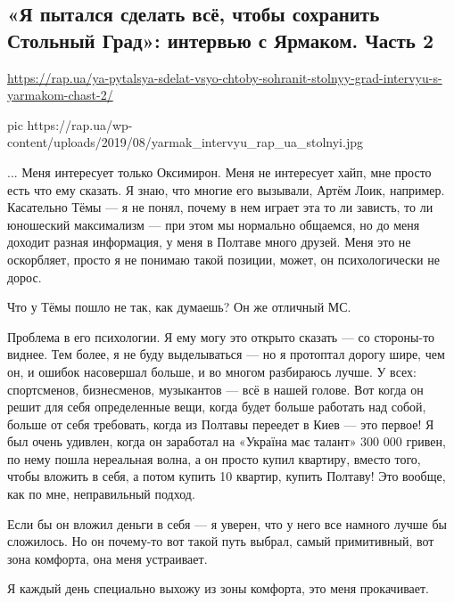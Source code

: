  
 

\subsection{«Я пытался сделать всё, чтобы сохранить Стольный Град»: интервью с Ярмаком. Часть 2}
\label{sec:02_02_2017.news.ua.rap_ua.2.yarmak}
\url{https://rap.ua/ya-pytalsya-sdelat-vsyo-chtoby-sohranit-stolnyy-grad-intervyu-s-yarmakom-chast-2/}

\ifcmt
pic https://rap.ua/wp-content/uploads/2019/08/yarmak_intervyu_rap_ua_stolnyi.jpg
\fi

... Меня интересует только Оксимирон. Меня не интересует хайп, мне просто есть
что ему сказать. Я знаю, что многие его вызывали, Артём Лоик, например.
Касательно Тёмы --- я не понял, почему в нем играет эта то ли зависть, то ли
юношеский максимализм --- при этом мы нормально общаемся, но до меня доходит
разная информация, у меня в Полтаве много друзей. Меня это не оскорбляет,
просто я не понимаю такой позиции, может, он психологически не дорос.

Что у Тёмы пошло не так, как думаешь? Он же отличный МС.

Проблема в его психологии. Я ему могу это открыто сказать --- со стороны-то
виднее. Тем более, я не буду выделываться --- но я протоптал дорогу шире, чем он,
и ошибок насовершал больше, и во многом разбираюсь лучше. У всех: спортсменов,
бизнесменов, музыкантов --- всё в нашей голове. Вот когда он решит для себя
определенные вещи, когда будет больше работать над собой, больше от себя
требовать, когда из Полтавы переедет в Киев --- это первое! Я был очень удивлен,
когда он заработал на «Україна має талант» 300 000 гривен, по нему пошла
нереальная волна, а он просто купил квартиру, вместо того, чтобы вложить в
себя, а потом купить 10 квартир, купить Полтаву! Это вообще, как по мне,
неправильный подход.

Если бы он вложил деньги в себя --- я уверен, что у него все намного лучше бы
сложилось. Но он почему-то вот такой путь выбрал, самый примитивный, вот зона
комфорта, она меня устраивает.

Я каждый день специально выхожу из зоны комфорта, это меня прокачивает.

